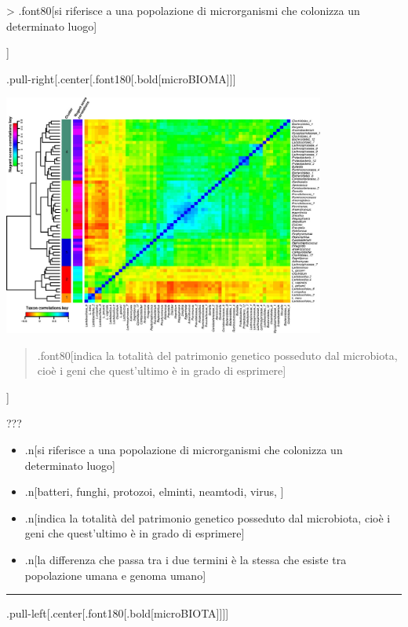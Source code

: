 \documentclass[
]{article}
\begin{document}
\textgreater{} .font80{[}si riferisce a una popolazione di microrganismi
che colonizza un determinato luogo{]}

{]}

.pull-right{[}.center{[}.font180{[}.bold{[}microBIOMA{]}{]}{]}

\begin{center}\includegraphics[width=400px]{images/microbioma} \end{center}

\begin{quote}
.font80{[}indica la totalità del patrimonio genetico posseduto dal
microbiota, cioè i geni che quest'ultimo è in grado di esprimere{]}
\end{quote}

{]}

???

\begin{itemize}
\item
  .n{[}si riferisce a una popolazione di microrganismi che colonizza un
  determinato luogo{]}
\item
  .n{[}batteri, funghi, protozoi, elminti, neamtodi, virus, {]}
\item
  .n{[}indica la totalità del patrimonio genetico posseduto dal
  microbiota, cioè i geni che quest'ultimo è in grado di esprimere{]}
\item
  .n{[}la differenza che passa tra i due termini è la stessa che esiste
  tra popolazione umana e genoma umano{]}
\end{itemize}

\begin{center}\rule{0.5\linewidth}{0.5pt}\end{center}

.pull-left{[}.center{[}.font180{[}.bold{[}microBIOTA{]}{]}{]}{]}
\end{document}
